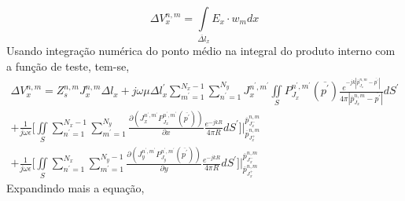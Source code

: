 \documentclass[
	12pt,				%
	openright,			%
	oneside,			%
	a4papey79r,			%
	english,			%
	brazil				%
	]{abntex2}
\begin{document}
\begin{equation}
     \Delta V_{x}^{n,m}=\int \limits_{\overline{\Delta l}_x}E_{x} \cdot w_m dx
\end{equation}
Usando integração numérica do ponto médio na integral do produto interno com a função de teste,  tem-se,
\begin{equation}
\begin{aligned}
      \Delta V_{x}^{n,m}= Z_s^{n,m}  J_{x}^{n,m}  {\Delta l}_x
      +
j\omega \mu   {\Delta l}^{{'}}_x \sum_{m^{'}=1}^{N_x-1}\sum_{n^{'}=1}^{N_y} J_{x}^{n^{'},m^{'}} \iint\limits_{S}  P_{J_x}^{n^{'},m^{'}}(\overline{p^{'}})   \frac{e^{-j k |\overline{p}_{{J_x}}^{n,m}-\overline{p^{'}}|}}{4 \pi |\overline{p}_{{J_x}}^{n,m}-\overline{p^{'}}|} dS^{'}    \\
   + 
   \frac{1}{j\omega \epsilon}\biggl[ \iint\limits_{S} \sum_{n^{'}=1}^{N_x-1}\sum_{m^{'}=1}^{N_y}\frac{\partial (J_{x}^{n^{'},m^{'}}P_{J_x}^{n^{'},m^{'}}(\overline{p^{'}})  )}{\partial x}  \frac{e^{-j k R}}{4 \pi R} dS^{'}  \biggl] \biggl |_{\overline{p}_{{J_x^{+}}}^{n,m}}^{\overline{p}_{{J_x^{-}}}^{n,m}}\\
  + 
  \frac{1}{j\omega \epsilon}\biggl[ \iint\limits_{S}\sum_{n^{'}=1}^{N_x}\sum_{m^{'}=1}^{N_y-1} \frac{\partial (J_{y}^{n^{'},m^{'}}P_{J_y}^{n^{'},m^{'}} (\overline{p^{'}})    )}{\partial y}  \frac{e^{-j k R}}{4 \pi R} dS^{'}  \biggl] \biggl |_{\overline{p}_{{J_x^{+}}}^{n,m}}^{\overline{p}_{{J_x^{-}}}^{n,m}}
\end{aligned}
\end{equation}
Expandindo mais a equação,
\end{document}

